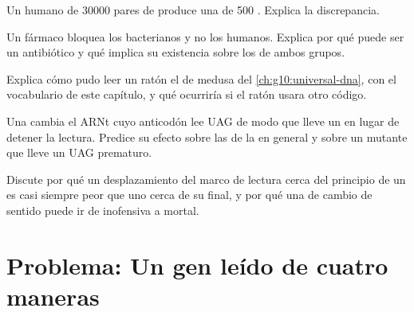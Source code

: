 \begin{exercise}[$\star\star$]\label{exo:g11:gene-expression:11}
Un  humano de \num{30000} pares de  produce una  de 500
. Explica la discrepancia.
\end{exercise}

\begin{exercise}[$\star\star\star$]\label{exo:g11:gene-expression:12}
Un fármaco bloquea los  bacterianos y no los humanos. Explica
por qué puede ser un antibiótico y qué implica su existencia sobre los
 de ambos grupos.
\end{exercise}

\begin{exercise}[$\star\star\star$]\label{exo:g11:gene-expression:13}
Explica cómo pudo leer un ratón el  de medusa del
\cref{ch:g10:universal-dna}, con el vocabulario de este capítulo, y qué
ocurriría si el ratón usara otro código.
\end{exercise}

\begin{exercise}[$\star\star\star$]\label{exo:g11:gene-expression:14}
Una  cambia el ARNt cuyo anticodón lee UAG de modo que lleve un
 en lugar de detener la lectura. Predice su efecto sobre las
 de la  en general y sobre un  mutante que lleve un
UAG prematuro.
\end{exercise}

\begin{exercise}[$\star\star\star$]\label{exo:g11:gene-expression:15}
Discute por qué un desplazamiento del marco de lectura cerca del
principio de un  es casi siempre peor que uno cerca de su final, y
por qué una  de cambio de sentido puede ir de inofensiva a
mortal.
\end{exercise}

\section{Problema: Un gen leído de cuatro maneras}


